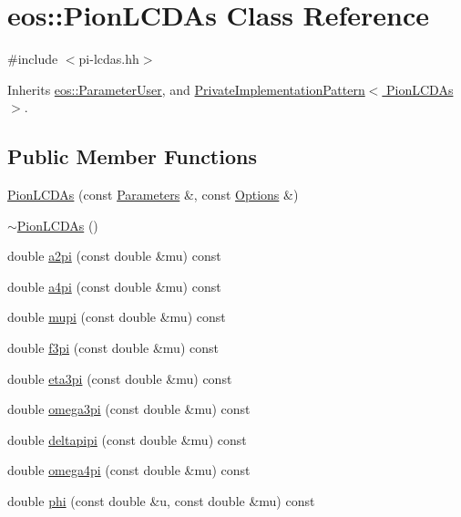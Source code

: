 \hypertarget{classeos_1_1PionLCDAs}{
\section{eos::PionLCDAs Class Reference}
\label{classeos_1_1PionLCDAs}
}


{\ttfamily \#include $<$pi-\/lcdas.hh$>$}

Inherits \hyperlink{classeos_1_1ParameterUser}{eos::ParameterUser}, and \hyperlink{classeos_1_1PrivateImplementationPattern}{PrivateImplementationPattern$<$ PionLCDAs $>$}.\subsection*{Public Member Functions}
\begin{DoxyCompactItemize}
\item 
\hyperlink{classeos_1_1PionLCDAs_af4511a0652b92c1b152580de069d4ac5}{PionLCDAs} (const \hyperlink{classeos_1_1Parameters}{Parameters} \&, const \hyperlink{classeos_1_1Options}{Options} \&)
\item 
\hyperlink{classeos_1_1PionLCDAs_a6292a3aaf8e686e3fc319a1b7901f817}{$\sim$PionLCDAs} ()
\item 
double \hyperlink{classeos_1_1PionLCDAs_a4daa8e6632fb5ad61c13f7a7c4a91bbf}{a2pi} (const double \&mu) const 
\item 
double \hyperlink{classeos_1_1PionLCDAs_a0d0c446b70ca3078a36d064ffe5ae46c}{a4pi} (const double \&mu) const 
\item 
double \hyperlink{classeos_1_1PionLCDAs_ad9453233816c40f020512b302e37b7ab}{mupi} (const double \&mu) const 
\item 
double \hyperlink{classeos_1_1PionLCDAs_af557dad976202ea84cd889721b080fb9}{f3pi} (const double \&mu) const 
\item 
double \hyperlink{classeos_1_1PionLCDAs_a571ec82df903c4690aa2464a4ddd23a8}{eta3pi} (const double \&mu) const 
\item 
double \hyperlink{classeos_1_1PionLCDAs_ab821dbbf52dd22ff63c08ecda4000366}{omega3pi} (const double \&mu) const 
\item 
double \hyperlink{classeos_1_1PionLCDAs_a605c4669795addc7a36752f6c07571e4}{deltapipi} (const double \&mu) const 
\item 
double \hyperlink{classeos_1_1PionLCDAs_a999a73d4b408e5b36a1ff7cd5c86c24a}{omega4pi} (const double \&mu) const 
\item 
double \hyperlink{classeos_1_1PionLCDAs_a25af0e77528227031bdba7c630246c3a}{phi} (const double \&u, const double \&mu) const 

\end{DoxyCompactItemize}
